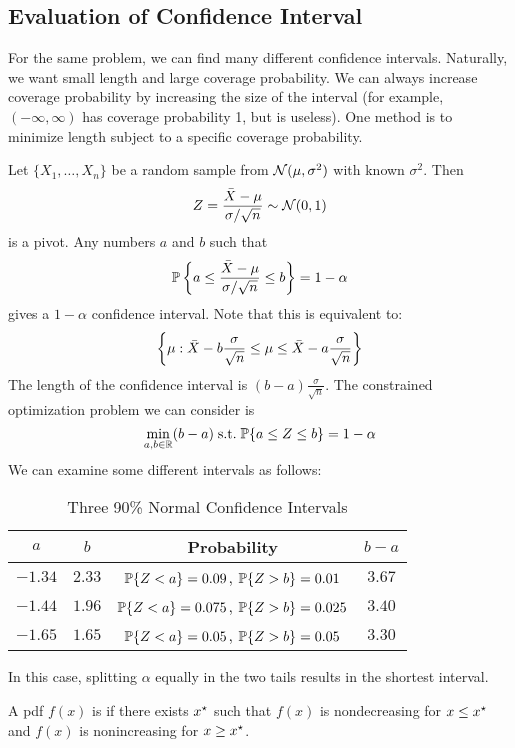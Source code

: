 \documentclass[10pt]{article}
\begin{document}
\subsection{Evaluation of Confidence Interval}

\begin{remark}
	For the same problem, we can find many different confidence intervals. Naturally, we want small length and large coverage probability. We can always increase coverage probability by increasing the size of the interval (for example, $(-\infty,\infty)$ has coverage probability 1, but is useless). One method is to minimize length subject to a specific coverage probability.
\end{remark}

\begin{example}
	Let $\{X_1,\dots,X_n\}$ be a random sample from $\mathcal{N}(\mu,\sigma^2)$ with known $\sigma^2$. Then
	\[
	Z = \frac{\bar{X} - \mu}{\sigma / \sqrt{n}} \sim \mathcal{N}(0,1)
	\]
	is a pivot. Any numbers $a$ and $b$ such that
	\[
	\mathbb{P}\left\{ a \le  \frac{\bar{X} - \mu}{\sigma / \sqrt{n}} \le b\right\} = 1-\alpha
	\]
	gives a $1-\alpha$ confidence interval. Note that this is equivalent to:
	\[
	\left\{ \mu : \bar{X} - b \frac{\sigma}{\sqrt{n}} \le \mu \le  \bar{X} - a \frac{\sigma}{\sqrt{n}}\right\}
	\]
	The length of the confidence interval is $(b-a)\frac{\sigma}{\sqrt{n}}$. The constrained optimization problem we can consider is
	\[
	\min_{a,b \in \mathbb{R}} (b-a) \;\text{s.t.}\; \mathbb{P}\{a \le Z \le b\} = 1-\alpha
	\]
	We can examine some different intervals as follows:
	\begin{table}[H]
		\centering
		\begin{tabular}{|c | c | c | c|}
		\hline
		$a$ & $b$ & Probability & $b - a$ \\
		\hline 
		$-1.34$ & $2.33$ & $\mathbb{P}\{Z < a\} = 0.09$, $\mathbb{P}\{Z > b\} = 0.01$ & $3.67$ \\
		\hline 
		$-1.44$ & $1.96$ & $\mathbb{P}\{Z < a\} = 0.075$, $\mathbb{P}\{Z > b\} = 0.025$ & $3.40$ \\
		\hline 
		$-1.65$ & $1.65$ & $\mathbb{P}\{Z < a\} = 0.05$, $\mathbb{P}\{Z > b\} = 0.05$ & $3.30$ \\
		\hline
		\end{tabular}
		\caption{Three 90\% Normal Confidence Intervals}
	\end{table}
	In this case, splitting $\alpha$ equally in the two tails results in the shortest interval.
\end{example}

\begin{definition}
	A pdf $f(x)$ is  if there exists $x^\star$ such that $f(x)$ is nondecreasing for $x \le x^\star$ and $f(x)$ is nonincreasing for $x \ge x^\star$.
\end{definition}
\end{document}
